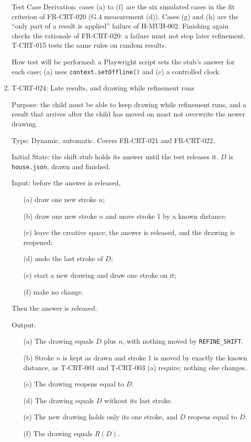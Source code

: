 \documentclass[12pt, titlepage]{article}
\newcommand{\testitem}[1]{\item #1\par\nopagebreak}
\begin{document}
\begin{enumerate}
Test Case Derivation: cases (a) to (f) are the six simulated cases in the fit
criterion of FR-CRT-020 (G.4 measurement (d)). Cases (g) and (h) are the
``only part of a result is applied'' failure of H-MUH-002. Finishing again
checks the rationale of FR-CRT-020: a failure must not stop later
refinement. T-CRT-015 tests the same rules on random results.

How test will be performed: a Playwright script sets the stub's answer for
each case; (a) uses \texttt{context.setOffline()} and (c) a controlled
clock.

\testitem{T-CRT-024: Late results, and drawing while refinement runs}

Purpose: the child must be able to keep drawing while refinement runs, and
a result that arrives after the child has moved on must not overwrite the
newer drawing.

Type: Dynamic, automatic. Covers FR-CRT-021 and FR-CRT-022.

Initial State: the shift stub holds its answer until the test releases it.
$D$ is \texttt{house.json}, drawn and finished.

Input: before the answer is released,
\begin{itemize}
\item[(a)] draw one new stroke $n$;
\item[(b)] draw one new stroke $n$ and move stroke 1 by a known distance;
\item[(c)] leave the creative space; the answer is released, and the drawing
is reopened;
\item[(d)] undo the last stroke of $D$;
\item[(e)] start a new drawing and draw one stroke on it;
\item[(f)] make no change.
\end{itemize}
Then the answer is released.

Output:
\begin{itemize}
\item[(a)] The drawing equals $D$ plus $n$, with nothing moved by
\texttt{REFINE\_SHIFT}.
\item[(b)] Stroke $n$ is kept as drawn and stroke 1 is moved by exactly the
known distance, as T-CRT-001 and T-CRT-003 (a) require; nothing else
changes.
\item[(c)] The drawing reopens equal to $D$.
\item[(d)] The drawing equals $D$ without its last stroke.
\item[(e)] The new drawing holds only its one stroke, and $D$ reopens equal
to $D$.
\item[(f)] The drawing equals $R(D)$.
\end{itemize}


\end{enumerate}
\end{document}
